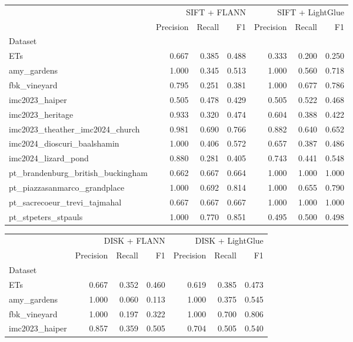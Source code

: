 \documentclass[report.tex]{subfiles}
\begin{document}
\begin{table}
\centering
\begin{tabular}{lrrrrrr}
\toprule
 & \multicolumn{3}{r}{SIFT + FLANN} & \multicolumn{3}{r}{SIFT + LightGlue} \\
 & Precision & Recall & F1 & Precision & Recall & F1 \\
Dataset &  &  &  &  &  &  \\
\midrule
ETs & 0.667 & 0.385 & 0.488 & 0.333 & 0.200 & 0.250 \\
amy\_gardens & 1.000 & 0.345 & 0.513 & 1.000 & 0.560 & 0.718 \\
fbk\_vineyard & 0.795 & 0.251 & 0.381 & 1.000 & 0.677 & 0.786 \\
imc2023\_haiper & 0.505 & 0.478 & 0.429 & 0.505 & 0.522 & 0.468 \\
imc2023\_heritage & 0.933 & 0.320 & 0.474 & 0.604 & 0.388 & 0.422 \\
imc2023\_theather\_imc2024\_church & 0.981 & 0.690 & 0.766 & 0.882 & 0.640 & 0.652 \\
imc2024\_dioscuri\_baalshamin & 1.000 & 0.406 & 0.572 & 0.657 & 0.387 & 0.486 \\
imc2024\_lizard\_pond & 0.880 & 0.281 & 0.405 & 0.743 & 0.441 & 0.548 \\
pt\_brandenburg\_british\_buckingham & 0.662 & 0.667 & 0.664 & 1.000 & 1.000 & 1.000 \\
pt\_piazzasanmarco\_grandplace & 1.000 & 0.692 & 0.814 & 1.000 & 0.655 & 0.790 \\
pt\_sacrecoeur\_trevi\_tajmahal & 0.667 & 0.667 & 0.667 & 1.000 & 1.000 & 1.000 \\
pt\_stpeters\_stpauls & 1.000 & 0.770 & 0.851 & 0.495 & 0.500 & 0.498 \\
\bottomrule
\end{tabular}
\vspace{5em}
\begin{tabular}{lrrrrrr}
\toprule
 & \multicolumn{3}{r}{DISK + FLANN} & \multicolumn{3}{r}{DISK + LightGlue} \\
 & Precision & Recall & F1 & Precision & Recall & F1 \\
Dataset &  &  &  &  &  &  \\
\midrule
ETs & 0.667 & 0.352 & 0.460 & 0.619 & 0.385 & 0.473 \\
amy\_gardens & 1.000 & 0.060 & 0.113 & 1.000 & 0.375 & 0.545 \\
fbk\_vineyard & 1.000 & 0.197 & 0.322 & 1.000 & 0.700 & 0.806 \\
imc2023\_haiper & 0.857 & 0.359 & 0.505 & 0.704 & 0.505 & 0.540 \\

\end{tabular}
\end{table}
\end{document}
